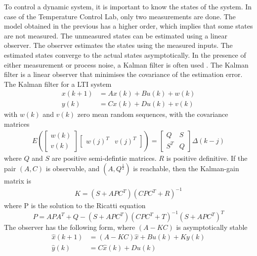 \label{sec:kalmanFilter}
To control a dynamic system, it is important to know the states of the system. In case of the Temperature Control Lab, only two measurements are done. The model obtained in the previous has a higher order, which implies that some states are not measured. The unmeasured states can be estimated using a linear observer. The observer estimates the states using the measured inputs. The estimated states converge to the actual states asymptotically.
In the presence of either measurement or process noise, a Kalman filter is often used \cite{kalmanFilter}. The Kalman filter is a linear observer that minimises the covariance of the estimation error. The Kalman filter for a LTI system \cite[p.~162]{FilteringIdentification}
\begin{align*}
    x(k+1) &= Ax(k) +Bu(k) + w(k)\\
    y(k) &= Cx(k) + Du(k) + v(k)
\end{align*}
with $w(k)$ and $v(k)$ zero mean random sequences, with the covariance matrices
\begin{align*}
    E(\begin{bmatrix} w(k) \\ v(k) \end{bmatrix} \begin{bmatrix} w(j)^T & v(j)^T \end{bmatrix}) = \begin{bmatrix} Q & S \\ S^T & Q \end{bmatrix} \Delta(k-j)
\end{align*}
where $Q$ and $S$ are positive semi-defintie matrices. $R$ is positive definitive. If the pair $(A,C)$ is observable, and $(A,Q^{\frac{1}{2}})$ is reachable, then the Kalman-gain matrix is 
\begin{align*}
    K = (S+APC^T)(CPC^T+R)^{-1}
\end{align*}
where P is the solution to the Ricatti equation
$$
    P = APA^T + Q - (S+APC^T)(CPC^T+T)^{-1}(S+APC^T)^T
$$
The observer has the following form, where $(A-KC)$ is asymptotically stable
\begin{align}
    \hat{x}(k+1) &= (A-KC)\hat{x} + Bu(k) + Ky(k) \label{eq:kalmanSU1}\\
    \hat{y}(k) &= C\hat{x}(k) + Du(k) \label{eq:kalmanSU2}
\end{align}
